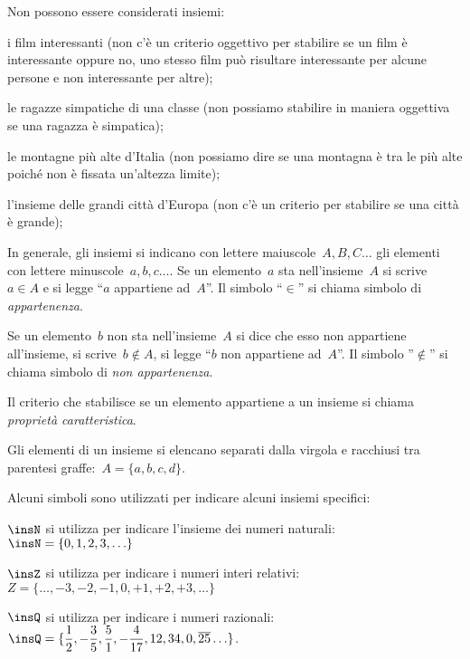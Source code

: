 Non possono essere considerati insiemi:
\begin{itemize*}
 \item i film interessanti (non c'è un criterio oggettivo per stabilire se 
un 
 film è interessante oppure no, uno stesso film
 può risultare interessante per alcune persone e non interessante per 
altre);
 \item le ragazze simpatiche di una classe (non possiamo stabilire in 
maniera 
 oggettiva se una ragazza è simpatica);
 \item le montagne più alte d'Italia (non possiamo dire se una montagna è 
tra 
 le più alte poiché non è fissata un'altezza limite);
 \item l'insieme delle grandi città d'Europa (non c'è un criterio per
stabilire se una città è grande);
\end{itemize*}


In generale, gli insiemi si indicano con lettere maiuscole~\(A, B, C\ldots\)
gli elementi con lettere minuscole~\(a, b, c\ldots\).
Se un elemento~\(a\) sta nell'insieme~\(A\) si scrive~\(a\in A\) e si legge 
``\(a\) appartiene ad~\(A\)''.
Il simbolo ``\(\in\)'' si chiama simbolo di \textit{appartenenza}.

Se un elemento~\(b\) non sta nell'insieme~\(A\) si dice
che esso non appartiene all'insieme, si scrive~\(b\notin A\),
si legge ``\(b\) non appartiene ad~\(A\)''. Il simbolo ''\(\notin\)''
si chiama simbolo di \textit{non appartenenza}.

Il criterio che stabilisce se un elemento appartiene a un insieme si chiama 
\textit{proprietà caratteristica}.

Gli elementi di un insieme si elencano separati dalla virgola e racchiusi 
tra parentesi graffe:~\(A=\{a,b,c,d\}\).

Alcuni simboli sono utilizzati per indicare alcuni insiemi specifici:
\begin{itemize*}
 \item \(\insN\) si utilizza per indicare l'insieme dei numeri 
  naturali:~\(\insN=\{0,1,2,3,\ldots\}\)
 \item \(\insZ\) si utilizza per indicare i numeri interi 
  relativi:~\(Z=\{\ldots,-3,-2,-1,0,+1,+2,+3,\ldots\}\)
 \item \(\insQ\) si utilizza per indicare i numeri 
 razionali:~\(\insQ=\{\dfrac{1}{2},-\dfrac{3}{5},\dfrac{5}{1},-
             \dfrac{4}{17},12,34,0,\overline{{25}}\ldots\}\).
 \end{itemize*}

